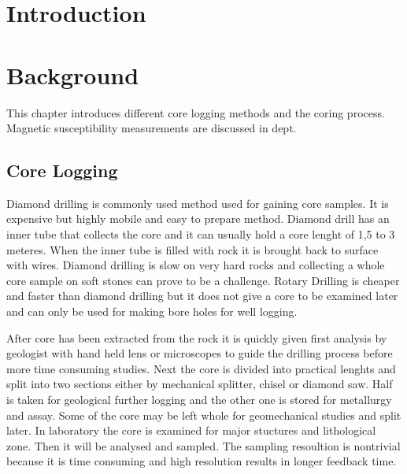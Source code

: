 \documentclass[12pt,a4paper,oneside,pdftex]{report}
\begin{document}

% 

\chapter{Introduction}
\label{chapter:intro}






% 

\chapter{Background}
\label{chapter:background}

This chapter introduces different core logging methods and the coring process. 
Magnetic susceptibility measurements are discussed in dept.

\section{Core Logging}

Diamond drilling is commonly used method used for gaining core samples. It is expensive but highly
mobile and easy to prepare method. Diamond drill has an inner tube that collects the core and it can 
usually  hold a core lenght of 1,5 to 3 meteres. When the inner tube is filled with rock it is brought
back to surface with wires. Diamond drilling is slow on very hard rocks and collecting a whole core
sample on soft stones can prove to be a challenge. Rotary Drilling is cheaper and faster than diamond
drilling but it does not give a core to be examined later and can only be used for making bore holes
for well logging.\cite{Peters1987}

After core has been extracted from the rock it is quickly given first analysis by geologist with 
hand held lens or microscopes to guide the drilling process before more time consuming studies. 
Next the core is divided into practical lenghts and split into two
sections either by mechanical splitter, chisel or diamond saw. Half is taken for geological further
logging and the other one is stored for metallurgy and assay. Some of the core may be left whole
for geomechanical studies and split later. In laboratory the core is examined for major 
stuctures and lithological zone. Then it will be analysed and sampled. The sampling resoultion 
is nontrivial because it is time consuming and high resolution results in longer feedback time.\cite{Peters1987}
\end{document}
